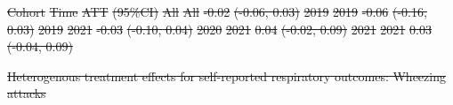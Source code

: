 \documentclass[
  letterpaper,
  DIV=11,
  numbers=noendperiod]{scrartcl}
\makeatletter
\renewenvironment{table}%
   {\renewcommand\familydefault\sfdefault
    \@float{table}}
   {\end@float}
\providecommand{\DIFdel}[1]{{\protect\color{red}\sout{#1}}}                      %
\providecommand{\DIFdelFL}[1]{\DIFdel{#1}} %
\makeatother
\begin{document}
\DIFdelFL{Cohort }%
\DIFdelFL{Time }%
\DIFdelFL{ATT }%
\DIFdelFL{(95\%CI)}%
\DIFdelFL{All }%
\DIFdelFL{All }%
\DIFdelFL{-0.02 }%
\DIFdelFL{(-0.06, 0.03)}%
\DIFdelFL{2019 }%
\DIFdelFL{2019 }%
\DIFdelFL{-0.06 }%
\DIFdelFL{(-0.16, 0.03)}%
\DIFdelFL{2019 }%
\DIFdelFL{2021 }%
\DIFdelFL{-0.03 }%
\DIFdelFL{(-0.10, 0.04)}%
\DIFdelFL{2020 }%
\DIFdelFL{2021 }%
\DIFdelFL{0.04 }%
\DIFdelFL{(-0.02, 0.09)}%
\DIFdelFL{2021 }%
\DIFdelFL{2021 }%
\DIFdelFL{0.03 }%
\DIFdelFL{(-0.04, 0.09)}%

{%
\DIFdelFL{Heterogenous treatment effects for self-reported respiratory outcomes:
Wheezing attacks }}%
\end{document}
